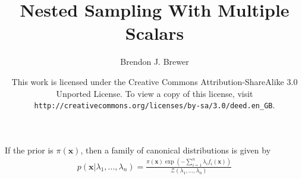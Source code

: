 \documentclass[a4paper, 11pt]{article}
\title{Nested Sampling With Multiple Scalars}
\author{Brendon J. Brewer}
\date{\vspace{3cm}This work is licensed under the Creative Commons Attribution-ShareAlike 3.0 Unported License. To view a copy of this license, visit {\tt http://creativecommons.org/licenses/by-sa/3.0/deed.en\_GB}.}
\begin{document}
\maketitle

If the prior is $\pi(\mathbf{x})$, then a family of canonical distributions
is given by
\begin{eqnarray}
p(\mathbf{x} | \lambda_1, ..., \lambda_n) = 
\frac{\pi(\mathbf{x})\exp(-\sum_{i=1}^n \lambda_i f_i(\mathbf{x}))}
{\mathcal{Z}(\lambda_1, ..., \lambda_n)}
\end{eqnarray}
\end{document}
